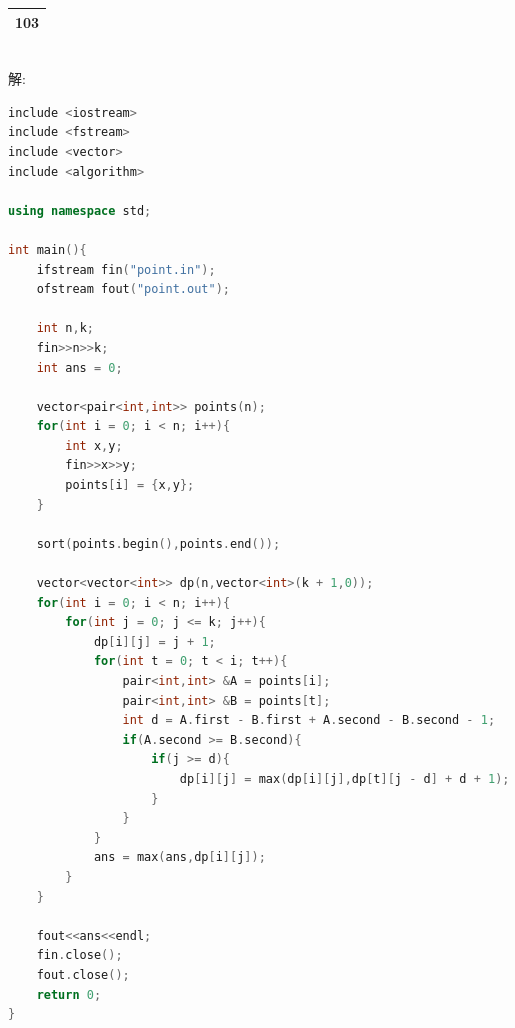 \documentclass[12pt,twiside,a4paper]{ctexbook}
\numberwithin{chapter}{part}
\begin{document}
\begin{tabular}{|c|}
\hline
103\\
\hline
\end{tabular}\\
解:
\begin{lstlisting}[language=C++,breaklines=true]
include <iostream>
include <fstream>
include <vector>
include <algorithm>

using namespace std;

int main(){
	ifstream fin("point.in");
	ofstream fout("point.out");

	int n,k;
	fin>>n>>k;
	int ans = 0;

	vector<pair<int,int>> points(n);
	for(int i = 0; i < n; i++){
		int x,y;
		fin>>x>>y;
		points[i] = {x,y};
	}

	sort(points.begin(),points.end());

	vector<vector<int>> dp(n,vector<int>(k + 1,0));
	for(int i = 0; i < n; i++){
		for(int j = 0; j <= k; j++){
			dp[i][j] = j + 1;
			for(int t = 0; t < i; t++){
				pair<int,int> &A = points[i];
				pair<int,int> &B = points[t];
				int d = A.first - B.first + A.second - B.second - 1;
				if(A.second >= B.second){
					if(j >= d){
						dp[i][j] = max(dp[i][j],dp[t][j - d] + d + 1);
					}
				}
			}
			ans = max(ans,dp[i][j]);
		}
	}

	fout<<ans<<endl;
	fin.close();
	fout.close();
	return 0;
}
\end{lstlisting}
\end{document}
